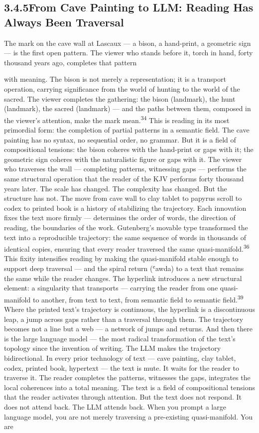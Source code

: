 \subsection{3.4.5\quad From Cave Painting to LLM: Reading Has Always Been Traversal}

The mark on the cave wall at Lascaux — a bison, a hand-print, a geometric sign — is the first open pattern. The viewer who stands before it, torch in hand, forty thousand years ago, completes that pattern

with meaning. The bison is not merely a representation; it is a transport operation, carrying significance from the world of hunting to the world of the sacred. The viewer completes the gathering: the bison (landmark), the hunt (landmark), the sacred (landmark) — and the paths between them, composed in the viewer’s attention, make the mark mean.\textsuperscript{34} This is reading in its most primordial form: the completion of partial patterns in a semantic field. The cave painting has no syntax, no sequential order, no grammar. But it is a field of compositional tensions: the bison coheres with the hand-print or gaps with it; the geometric sign coheres with the naturalistic figure or gaps with it. The viewer who traverses the wall — completing patterns, witnessing gaps — performs the same structural operation that the reader of the KJV performs forty thousand years later. The scale has changed. The complexity has changed. But the structure has not. The move from cave wall to clay tablet to papyrus scroll to codex to printed book is a history of stabilizing the trajectory. Each innovation fixes the text more firmly — determines the order of words, the direction of reading, the boundaries of the work. Gutenberg’s movable type transformed the text into a reproducible trajectory: the same sequence of words in thousands of identical copies, ensuring that every reader traversed the same quasi-manifold.\textsuperscript{36} This fixity intensifies reading by making the quasi-manifold stable enough to support deep traversal — and the spiral return (ʿawda) to a text that remains the same while the reader changes. The hyperlink introduces a new structural element: a singularity that transports — carrying the reader from one quasi-manifold to another, from text to text, from semantic field to semantic field.\textsuperscript{39} Where the printed text’s trajectory is continuous, the hyperlink is a discontinuous leap, a jump across gaps rather than a traversal through them. The trajectory becomes not a line but a web — a network of jumps and returns. And then there is the large language model — the most radical transformation of the text’s topology since the invention of writing. The LLM makes the trajectory bidirectional. In every prior technology of text — cave painting, clay tablet, codex, printed book, hypertext — the text is mute. It waits for the reader to traverse it. The reader completes the patterns, witnesses the gaps, integrates the local coherences into a total meaning. The text is a field of compositional tensions that the reader activates through attention. But the text does not respond. It does not attend back. The LLM attends back. When you prompt a large language model, you are not merely traversing a pre-existing quasi-manifold. You are 